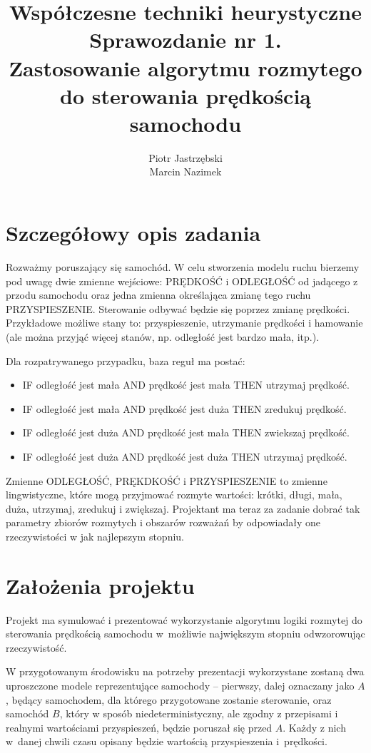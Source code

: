 \documentclass[11pt,a4paper]{article}
\title{Współczesne techniki heurystyczne\\ Sprawozdanie nr 1.\\ \large Zastosowanie algorytmu rozmytego do sterowania prędkością samochodu}
\author{Piotr Jastrzębski\\ Marcin Nazimek}
\date{}
\begin{document}
\maketitle

\section{Szczegółowy opis zadania}\label{opis}
Rozważmy poruszający się samochód. W celu stworzenia modelu ruchu bierzemy pod uwagę dwie zmienne wejściowe: PRĘDKOŚĆ i ODLEGŁOŚĆ od jadącego z przodu samochodu oraz jedna zmienna określająca zmianę tego ruchu PRZYSPIESZENIE. Sterowanie odbywać będzie się poprzez zmianę prędkości. Przykładowe możliwe stany to: przyspieszenie, utrzymanie prędkości i hamowanie (ale można przyjąć więcej stanów, np. odległość jest bardzo mała, itp.).

Dla rozpatrywanego przypadku, baza reguł ma postać:
\begin{itemize}
\item IF odległość jest mała AND prędkość jest mała THEN utrzymaj prędkość.
\item IF odległość jest mała AND prędkość jest duża THEN zredukuj prędkość.
\item IF odległość jest duża AND prędkość jest mała THEN zwiekszaj prędkość.
\item IF odległość jest duża AND prędkość jest duża THEN utrzymaj prędkość.
\end{itemize}
Zmienne ODLEGŁOŚĆ, PRĘKDKOŚĆ i PRZYSPIESZENIE to zmienne lingwistyczne, które mogą przyjmować rozmyte wartości: krótki, długi, mała, duża, utrzymaj, zredukuj i zwiększaj. Projektant ma teraz za zadanie dobrać tak parametry zbiorów rozmytych i obszarów rozważań by odpowiadały one rzeczywistości w jak najlepszym stopniu.

\section{Założenia projektu}\label{zalozenia}
Projekt ma symulować i prezentować wykorzystanie algorytmu logiki rozmytej do sterowania prędkością samochodu w~możliwie największym stopniu odwzorowując rzeczywistość.

W przygotowanym środowisku na potrzeby prezentacji wykorzystane zostaną dwa uproszczone modele reprezentujące samochody -- pierwszy, dalej oznaczany jako $A$, będący samochodem, dla którego przygotowane zostanie sterowanie, oraz samochód $B$, który w sposób niedeterministyczny, ale zgodny z przepisami i realnymi wartościami przyspieszeń, będzie poruszał się przed $A$. Każdy z nich w~danej chwili czasu opisany będzie wartością przyspieszenia i~prędkości.
\end{document}
